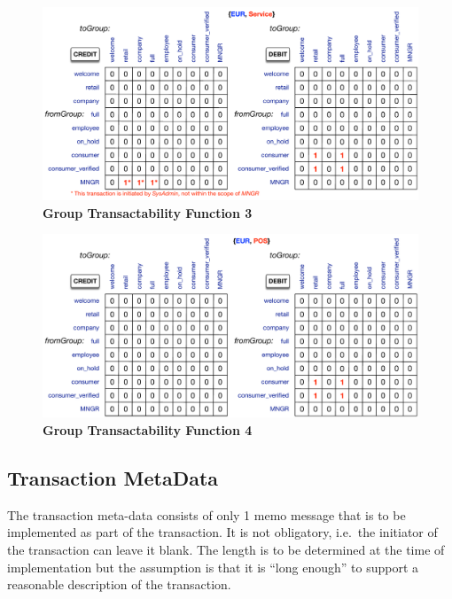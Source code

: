 \begin{figure}[H]
\centering
\includegraphics[width=16cm]{Figures/GTF3}
\caption{\small\textbf{Group Transactability Function 3}}
\label{fig:GTF3}
\vspace{-1cm}
\end{figure}

\begin{figure}[H]
\vspace{-0.5cm}
\centering
\includegraphics[width=16cm]{Figures/GTF4}
\caption{\small\textbf{Group Transactability Function 4}}
\label{fig:GTF4}
\end{figure}


\subsection{Transaction MetaData}

The transaction meta-data consists of only 1 memo message that is to be implemented as part of the transaction. It is not obligatory, i.e.\ the initiator of the transaction can leave it blank. The length is to be determined at the time of implementation but the assumption is that it is ``long enough'' to support a reasonable description of the transaction.

